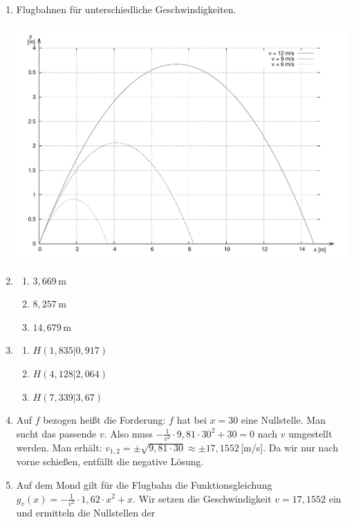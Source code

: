 \documentclass[12pt,a4paper,twoside,fleqn]{article}
\begin{document}
\begin{solution}
  \begin{enumerate}
  \item Flugbahnen für unterschiedliche Geschwindigkeiten.

    \includegraphics[width=.8\linewidth]{pics/graph_2}
  \item
    \begin{multicols}{3}
      \begin{enumerate}
      \item $3,669\,$m
      \item $8,257\,$m
      \item $14,679\,$m
      \end{enumerate}
    \end{multicols}
  \item
    \begin{multicols}{3}
      \begin{enumerate}
      \item $H(1,835|0,917)$
      \item $H(4,128|2,064)$
      \item $H(7,339|3,67)$
      \end{enumerate}
    \end{multicols}
  \item Auf $f$ bezogen heißt die Forderung: $f$ hat bei $x=30$ eine
    Nullstelle. Man sucht das passende $v$. Also muss
    $-\frac 1 {v^2} \cdot 9,81\cdot 30^2 + 30=0$ nach $v$
    umgestellt werden. Man erhält:
    $v_{1,2}=\pm\sqrt{9,81\cdot 30}\approx \pm 17,1552\,$[m/s]. Da wir
    nur nach vorne schießen, entfällt die negative Lösung.
  \item Auf dem Mond gilt für die Flugbahn die Funktionsgleichung 
    $g_v(x)=-\frac 1 {v^2} \cdot 1,62\cdot x^2 + x$. Wir setzen die
    Geschwindigkeit $v=17,1552$ ein und ermitteln die Nullstellen der

\end{enumerate}
\end{solution}
\end{document}
